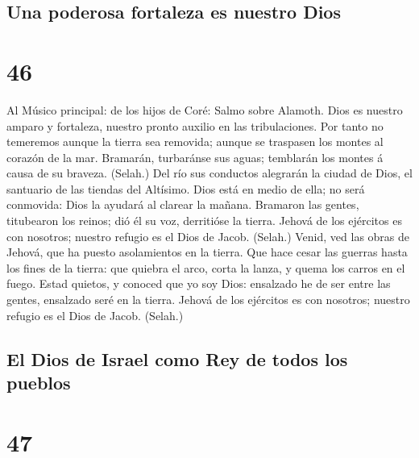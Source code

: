 \hypertarget{una-poderosa-fortaleza-es-nuestro-dios}{%
\subsection{Una poderosa fortaleza es nuestro
Dios}\label{una-poderosa-fortaleza-es-nuestro-dios}}

\hypertarget{section-45}{%
\section{46}\label{section-45}}

 Al Músico principal: de los hijos de Coré: Salmo sobre
Alamoth. Dios es nuestro amparo y fortaleza, nuestro pronto auxilio en
las tribulaciones.  Por tanto no temeremos aunque la
tierra sea removida; aunque se traspasen los montes al corazón de la
mar.  Bramarán, turbaránse sus aguas; temblarán los montes
á causa de su braveza. (Selah.)  Del río sus conductos
alegrarán la ciudad de Dios, el santuario de las tiendas del Altísimo.
 Dios está en medio de ella; no será conmovida: Dios la
ayudará al clarear la mañana.  Bramaron las gentes,
titubearon los reinos; dió él su voz, derritióse la tierra.
 Jehová de los ejércitos es con nosotros; nuestro refugio
es el Dios de Jacob. (Selah.)  Venid, ved las obras de
Jehová, que ha puesto asolamientos en la tierra.  Que hace
cesar las guerras hasta los fines de la tierra: que quiebra el arco,
corta la lanza, y quema los carros en el fuego.  Estad
quietos, y conoced que yo soy Dios: ensalzado he de ser entre las
gentes, ensalzado seré en la tierra.  Jehová de los
ejércitos es con nosotros; nuestro refugio es el Dios de Jacob. (Selah.)

\hypertarget{el-dios-de-israel-como-rey-de-todos-los-pueblos}{%
\subsection{El Dios de Israel como Rey de todos los
pueblos}\label{el-dios-de-israel-como-rey-de-todos-los-pueblos}}

\hypertarget{section-46}{%
\section{47}\label{section-46}}


